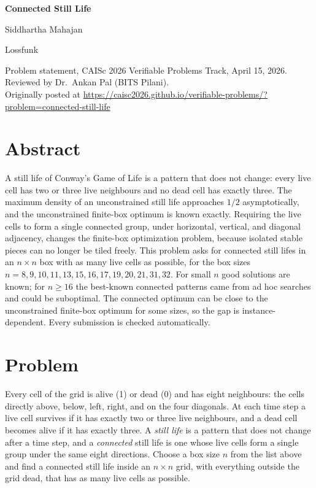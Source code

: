 \documentclass[11pt]{article}
\begin{document}
\thispagestyle{fancy}
\begin{center}
{\fontsize{26}{30}\selectfont\bfseries Connected Still Life\par}
\vspace{10pt}
{\fontsize{17}{21}\selectfont Siddhartha Mahajan\par}
\vspace{4pt}
{\normalsize Lossfunk\par}
\vspace{6pt}
{\small Problem statement, CAISc 2026 Verifiable Problems Track, April 15, 2026.\\
Reviewed by Dr.~Ankan Pal (BITS Pilani).\\
Originally posted at \url{https://caisc2026.github.io/verifiable-problems/?problem=connected-still-life}}
\end{center}

\section*{Abstract}
A still life of Conway's Game of Life is a pattern that does not change: every
live cell has two or three live neighbours and no dead cell has exactly three.
The maximum density of an unconstrained still life approaches $1/2$
asymptotically, and the unconstrained finite-box optimum is known exactly.
Requiring the live cells to form a single connected group, under horizontal,
vertical, and diagonal adjacency, changes the finite-box optimization problem,
because isolated stable pieces can no longer be tiled freely.  This problem asks
for connected still lifes in an $n\times n$ box with as many live cells as
possible, for the box sizes $n=8,9,10,11,13,15,16,17,19,20,21,31,32$.  For small
$n$ good solutions are known; for $n\ge16$ the best-known connected patterns came
from ad hoc searches and could be suboptimal.  The connected optimum can be close
to the unconstrained finite-box optimum for some sizes, so the gap is
instance-dependent.  Every submission is checked automatically.

\section*{Problem}
Every cell of the grid is alive (1) or dead (0) and has eight neighbours: the
cells directly above, below, left, right, and on the four diagonals.  At each
time step a live cell survives if it has exactly two or three live neighbours,
and a dead cell becomes alive if it has exactly three.  A \emph{still life} is a
pattern that does not change after a time step, and a \emph{connected} still
life is one whose live cells form a single group under the same eight
directions.  Choose a box size $n$ from the list above and find a connected still
life inside an $n\times n$ grid, with everything outside the grid dead, that has
as many live cells as possible.
\end{document}
